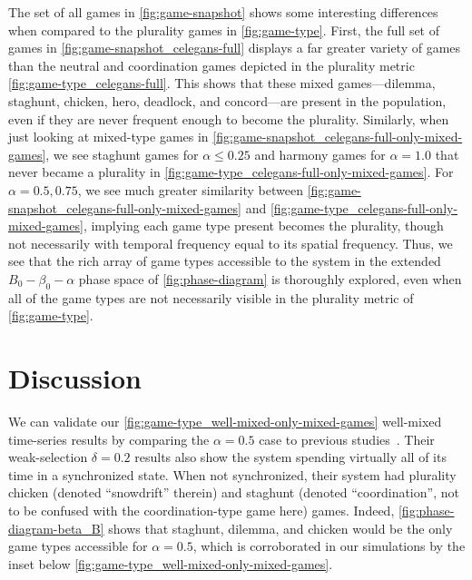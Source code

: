 \documentclass[10pt,letterpaper]{article}
\begin{document}
The set of all games in \cref{fig:game-snapshot} shows some interesting
differences when compared to the plurality games in
\cref{fig:game-type}.
First,
the full set of games in
\cref{fig:game-snapshot_celegans-full}
displays a far greater variety of games than the neutral and
coordination games depicted in the plurality metric
\cref{fig:game-type_celegans-full}.
This shows that these mixed games---dilemma, staghunt, chicken, hero,
deadlock, and concord---are present in the population,
even if they are never frequent enough to become the plurality.
Similarly, when just looking at mixed-type games in
\cref{fig:game-snapshot_celegans-full-only-mixed-games},
we see staghunt games for $\alpha \le 0.25$
and
harmony games for $\alpha = 1.0$
that never became a
plurality
in \cref{fig:game-type_celegans-full-only-mixed-games}.
For $\alpha = 0.5, 0.75$,
we see much greater similarity between
\cref{fig:game-snapshot_celegans-full-only-mixed-games}
and
\cref{fig:game-type_celegans-full-only-mixed-games},
implying each game type present becomes the plurality,
though not necessarily with temporal frequency
equal to its spatial frequency.
Thus, we see that the rich array of game types accessible to the system
in the extended $B_0-\beta_0-\alpha$ phase space of
\cref{fig:phase-diagram}
is thoroughly explored, even when all of the game types are not
necessarily visible in the plurality metric of \cref{fig:game-type}.

\section{Discussion}\label{sec:discussion}

We can validate our \cref{fig:game-type_well-mixed-only-mixed-games} well-mixed
time-series results by comparing the $\alpha = 0.5$ case
to previous studies~\cite{tripp2022evolutionary}.
Their weak-selection $\delta = 0.2$
results also show the system spending
virtually all of its time in a synchronized state.
When not synchronized, their system had plurality
chicken (denoted ``snowdrift'' therein)
and staghunt (denoted ``coordination'',
not to be confused with the coordination-type game here) games.
Indeed, \cref{fig:phase-diagram-beta_B}
shows that staghunt, dilemma, and chicken
would be the only game types accessible for $\alpha = 0.5$,
which is corroborated in our simulations by the inset below
\cref{fig:game-type_well-mixed-only-mixed-games}.
\end{document}
